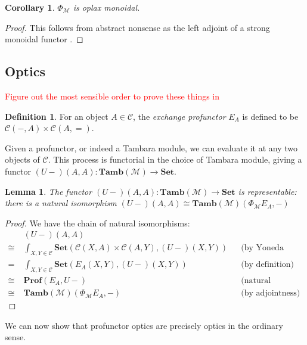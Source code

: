 \documentclass[11pt,a4paper]{article}
\theoremstyle{plain}
\newtheorem{lemma}[theorem]{Lemma}
\newtheorem{corollary}[theorem]{Corollary}
\theoremstyle{definition}
\newtheorem{definition}[theorem]{Definition}
\newcommand{\C}{\mathscr{C}}
\newcommand{\M}{\mathscr{M}}
\newcommand{\Pastro}{\Phi}
\newcommand{\Set}{\mathbf{Set}}
\newcommand{\Prof}{\mathbf{Prof}}
\newcommand{\Tamb}{\mathbf{Tamb}}
\newcommand{\todo}[1]{\textcolor{red}{\small #1}}
\begin{document}
\begin{corollary}
$\Pastro_\M$ is oplax monoidal.
\end{corollary}
\begin{proof}
This follows from abstract nonsense as the left adjoint of a strong monoidal functor \cite{Kelly1974}.
\end{proof}

\subsection{Optics}
\todo{Figure out the most sensible order to prove these things in}

\begin{definition}
For an object $A \in \C$, the \emph{exchange profunctor} $E_A$ is defined to be $\C(-, A) \times \C(A, {=})$.
\end{definition}

Given a profunctor, or indeed a Tambara module, we can evaluate it at any two objects of $\C$. This process is functorial in the choice of Tambara module, giving a functor $(U-)(A,A) : \Tamb(\M) \to \Set$.

\begin{lemma}
\label{lemma-rep}
The functor $(U-)(A,A) : \Tamb(\M) \to \Set$ is representable: there is a natural isomorphism
$(U-)(A,A) \cong \Tamb(\M)(\Pastro_\M E_A, -)$
\end{lemma}
\begin{proof}
We have the chain of natural isomorphisms:
\begin{align*}
&(U-)(A,A) \\
\cong \;&\int_{X,Y \in \C} \Set(\C(X,A) \times \C(A,Y), (U-)(X,Y)) && \text{(by Yoneda (un)reduction twice)} \\
=\;&\int_{X,Y \in \C} \Set(E_A(X,Y), (U-)(X,Y)) && \text{(by definition)}\\
\cong \;&\Prof(E_A, U-) && \text{(natural transformations as ends)} \\
\cong \;&\Tamb(\M)(\Pastro_\M E_A, -) && \text{(by adjointness)} 
\end{align*}
\end{proof}

We can now show that profunctor optics are precisely optics in the ordinary sense.
\end{document}
